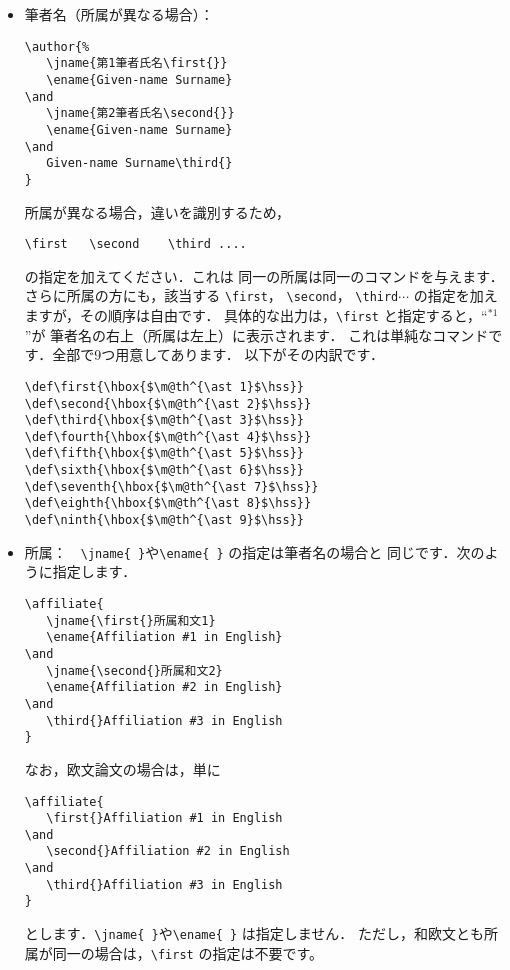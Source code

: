 \begin{itemize}
なお，欧文論文の場合は，単に
\begin{verbatim}
\author{%
   Given-name Surname
\and
   Given-name Surname
}
\end{verbatim}
としてください．\verb|\jname{ }|や\verb|\ename{ }| は指定しません．
\item 筆者名（所属が異なる場合）：　
\begin{verbatim}
\author{%
   \jname{第1筆者氏名\first{}}
   \ename{Given-name Surname}
\and
   \jname{第2筆者氏名\second{}}
   \ename{Given-name Surname}
\and
   Given-name Surname\third{}
}
\end{verbatim}
所属が異なる場合，違いを識別するため，
\begin{verbatim}
\first   \second    \third .... 
\end{verbatim}
の指定を加えてください．これは
同一の所属は同一のコマンドを与えます．
さらに所属の方にも，該当する \verb|\first|，\linebreak
\verb|\second|，
\verb|\third|$\cdots$ の指定を加えますが，その順序は自由です．
具体的な出力は，\verb|\first| と指定すると，``$^{\ast 1}$''が
筆者名の右上（所属は左上）に表示されます．
これは単純なコマンドです．全部で9つ用意してあります．
以下がその内訳です．
\begin{verbatim}
\def\first{\hbox{$\m@th^{\ast 1}$\hss}}
\def\second{\hbox{$\m@th^{\ast 2}$\hss}}
\def\third{\hbox{$\m@th^{\ast 3}$\hss}}
\def\fourth{\hbox{$\m@th^{\ast 4}$\hss}}
\def\fifth{\hbox{$\m@th^{\ast 5}$\hss}}
\def\sixth{\hbox{$\m@th^{\ast 6}$\hss}}
\def\seventh{\hbox{$\m@th^{\ast 7}$\hss}}
\def\eighth{\hbox{$\m@th^{\ast 8}$\hss}}
\def\ninth{\hbox{$\m@th^{\ast 9}$\hss}}
\end{verbatim}

\item 所属：　\verb|\jname{ }|や\verb|\ename{ }| の指定は筆者名の場合と
同じです．次のように指定します．
\begin{verbatim}
\affiliate{
   \jname{\first{}所属和文1}
   \ename{Affiliation #1 in English}
\and
   \jname{\second{}所属和文2}
   \ename{Affiliation #2 in English}
\and
   \third{}Affiliation #3 in English
}
\end{verbatim}
なお，欧文論文の場合は，単に
\begin{verbatim}
\affiliate{
   \first{}Affiliation #1 in English
\and
   \second{}Affiliation #2 in English
\and
   \third{}Affiliation #3 in English
}
\end{verbatim}
とします．\verb|\jname{ }|や\verb|\ename{ }| は指定しません．
ただし，和欧文とも所属が同一の場合は，\verb|\first| の指定は不要です。


\end{itemize}
